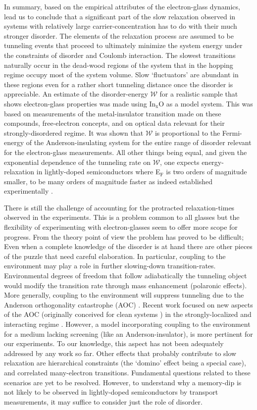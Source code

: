 \documentclass
[preprint,showpacs,byrevtex,10pt,twocolumn,tightenlines,prl,letterpaper]{revtex4}%
\begin{document}
In summary, based on the empirical attributes of the electron-glass dynamics,
lead us to conclude that a significant part of the slow relaxation observed in
systems with relatively large carrier-concentration has to do with their much
stronger disorder. The elements of the relaxation process are assumed to be
tunneling events that proceed to ultimately minimize the system energy under
the constraints of disorder and Coulomb interaction. The slowest transitions
naturally occur in the dead-wood regions of the system that in the hopping
regime occupy most of the system volume. Slow `fluctuators' are abundant in
these regions even for a rather short tunneling distance once the disorder is
appreciable. An estimate of the disorder-energy $\mathcal{W}$ for a realistic
sample that shows electron-glass properties was made using In$_{\text{x}}$O as
a model system. This was based on measurements of the metal-insulator
transition made on these compounds, free-electron concepts, and on optical
data relevant for their strongly-disordered regime. It was shown that
$\mathcal{W}$ is proportional to the Fermi-energy of the Anderson-insulating
system for the entire range of disorder relevant for the electron-glass
measurements. All other things being equal, and given the exponential
dependence of the tunneling rate on $\mathcal{W}$, one expects
energy-relaxation in lightly-doped semiconductors where E$_{\text{F}}$ is two
orders of magnitude smaller, to be many orders of magnitude faster as indeed
established experimentally \cite{25}.

There is still the challenge of accounting for the protracted relaxation-times
observed in the experiments. This is a problem common to all glasses but the
flexibility of experimenting with electron-glasses seem to offer more scope
for progress. From the theory point of view the problem has proved to be
difficult; Even when a complete knowledge of the disorder is at hand there are
other pieces of the puzzle that need careful elaboration. In particular,
coupling to the environment may play a role in further slowing-down
transition-rates. Environmental degrees of freedom that follow adiabatically
the tunneling object would modify the transition rate through mass enhancement
(polaronic effects). More generally, coupling to the environment will suppress
tunneling due to the Anderson orthogonality catastrophe (AOC) \cite{27}.
Recent work focused on new aspects of the AOC (originally conceived for clean
systems \cite{64}) in the strongly-localized and interacting regime
\cite{65,66}. However, a model incorporating coupling to the environment for a
medium lacking screening (like an Anderson-insulator), is more pertinent for
our experiments. To our knowledge, this aspect has not been adequately
addressed by any work so far. Other effects that probably contribute to slow
relaxation are hierarchical constraints (the `domino' effect being a special
case), and correlated many-electron transitions. Fundamental questions related
to these scenarios are yet to be resolved. However, to understand why a
memory-dip is not likely to be observed in lightly-doped semiconductors by
transport measurements, it may suffice to consider just the role of disorder.
\end{document}
